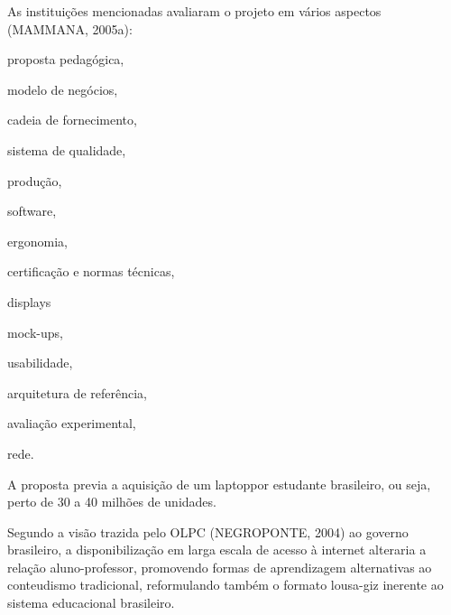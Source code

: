 \documentclass[
12pt,		%
openright,	%
twoside,  %
a4paper,			%
chapter=TITLE,		%
english,			%
french,				%
spanish,			%
brazil				%
]{USPSC-classe/USPSC}
\begin{document}
\noindent\begin{center}\mbox{\centering{}}\end{center}


As institui\c{c}\~oes mencionadas avaliaram o projeto em v\'arios aspectos  (MAMMANA, 2005a):










\begin{alineas}
\item proposta pedag\'ogica,
\item modelo de neg\'ocios,
\item cadeia de fornecimento,
\item sistema de qualidade,
\item produ\c{c}\~ao,
\item software,
\item ergonomia,
\item certifica\c{c}\~ao e normas t\'ecnicas,
\item displays
\item mock-ups,
\item usabilidade,
\item arquitetura de refer\^encia,
\item avalia\c{c}\~ao experimental,
\item rede.
\end{alineas}

A proposta previa a aquisi\c{c}\~ao de um \textquotedbl laptop\textquotedbl  por estudante brasileiro, ou seja, perto de 30 a 40 milh\~oes de unidades.









Segundo a vis\~ao trazida pelo OLPC  (NEGROPONTE, 2004) ao governo brasileiro, a disponibiliza\c{c}\~ao em larga escala de acesso \`a internet alteraria a rela\c{c}\~ao aluno-professor, promovendo formas de aprendizagem alternativas ao conteudismo tradicional, reformulando tamb\'em o formato lousa-giz inerente ao sistema educacional brasileiro.
\end{document}
